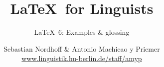 


\title{
	\LaTeX\ for Linguists
}

\subtitle{\LaTeX\ 6: Examples \& glossing}

\author[aMyP]{
	{\small Sebastian Nordhoff \& Antonio Machicao y Priemer}
	\\
	{\footnotesize \url{www.linguistik.hu-berlin.de/staff/amyp}}
}








\begin{frame}
  \HUtitle
\end{frame}





\nocite{Freitag&MyP15a}
\nocite{Knuth1986}
\nocite{Kopka94a}
\nocite{MyP17c}
\nocite{MyP&Kerkhof16a}
	


%
%
%
%
%


